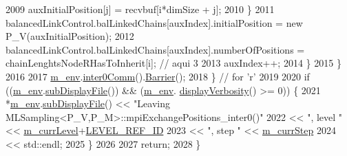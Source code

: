 \begin{DoxyCode}
2009           auxInitialPosition[j] = recvbuf[i*dimSize + j];
2010         \}
2011         balancedLinkControl.balLinkedChains[auxIndex].initialPosition = \textcolor{keyword}{new} P\_V(auxInitialPosition);
2012         balancedLinkControl.balLinkedChains[auxIndex].numberOfPositions = chainLenghtsNodeRHasToInherit[i];
       \textcolor{comment}{// aqui 3}
2013         auxIndex++;
2014       \}
2015     \}
2016 
2017     \hyperlink{class_q_u_e_s_o_1_1_m_l_sampling_a13f1ca4fe9f94822fe572a743eaced1d}{m\_env}.\hyperlink{class_q_u_e_s_o_1_1_base_environment_a689e4d140c74d495d97eb498714a4b82}{inter0Comm}().\hyperlink{class_q_u_e_s_o_1_1_mpi_comm_a4059971c30e023b272fccaa6aa00c426}{Barrier}();
2018   \} \textcolor{comment}{// for 'r'}
2019 
2020   \textcolor{keywordflow}{if} ((\hyperlink{class_q_u_e_s_o_1_1_m_l_sampling_a13f1ca4fe9f94822fe572a743eaced1d}{m\_env}.\hyperlink{class_q_u_e_s_o_1_1_base_environment_a8a0064746ae8dddfece4229b9ad374d6}{subDisplayFile}()) && (\hyperlink{class_q_u_e_s_o_1_1_m_l_sampling_a13f1ca4fe9f94822fe572a743eaced1d}{m\_env}.
      \hyperlink{class_q_u_e_s_o_1_1_base_environment_a1fe5f244fc0316a0ab3e37463f108b96}{displayVerbosity}() >= 0)) \{
2021     *\hyperlink{class_q_u_e_s_o_1_1_m_l_sampling_a13f1ca4fe9f94822fe572a743eaced1d}{m\_env}.\hyperlink{class_q_u_e_s_o_1_1_base_environment_a8a0064746ae8dddfece4229b9ad374d6}{subDisplayFile}() << \textcolor{stringliteral}{"Leaving
       MLSampling<P\_V,P\_M>::mpiExchangePositions\_inter0()"}
2022                             << \textcolor{stringliteral}{", level "} << \hyperlink{class_q_u_e_s_o_1_1_m_l_sampling_af9416874c856e50f3b35270e801f17e4}{m\_currLevel}+\hyperlink{_m_l_sampling_level_options_8h_a68d15eaf394d210effcf584b938206d3}{LEVEL\_REF\_ID}
2023                             << \textcolor{stringliteral}{", step "}  << \hyperlink{class_q_u_e_s_o_1_1_m_l_sampling_a1b1f8ccb4823bdfa26ec652f0807c63e}{m\_currStep}
2024                             << std::endl;
2025   \}
2026 
2027   \textcolor{keywordflow}{return};
2028 \}
\end{DoxyCode}
